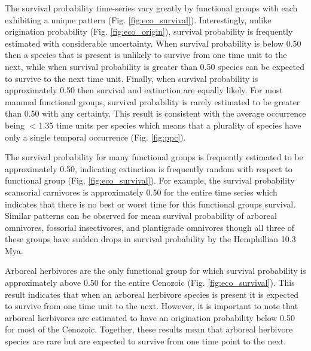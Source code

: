\documentclass[12pt,letterpaper]{article}
\begin{document}
The survival probability time-series vary greatly by functional groups with each exhibiting a unique pattern (Fig. \ref{fig:eco_survival}). Interestingly, unlike origination probability (Fig. \ref{fig:eco_origin}), survival probability is frequently estimated with considerable uncertainty. When survival probability is below 0.50 then a species that is present is unlikely to survive from one time unit to the next, while when survival probability is greater than 0.50 species can be expected to survive to the next time unit. Finally, when survival probability is approximately 0.50 then survival and extinction are equally likely. For most mammal functional groups, survival probability is rarely estimated to be greater than 0.50 with any certainty. This result is consistent with the average occurrence being \(<\)1.35 time units per species which means that a plurality of species have only a single temporal occurrence (Fig. \ref{fig:ppc}).

The survival probability for many functional groups is frequently estimated to be approximately 0.50, indicating extinction is frequently random with respect to functional group (Fig. \ref{fig:eco_survival}). For example, the survival probability scansorial carnivores is approximately 0.50 for the entire time series which indicates that there is no best or worst time for this functional groups survival. Similar patterns can be observed for mean survival probability of arboreal omnivores, fossorial insectivores, and plantigrade omnivores though all three of these groups have sudden drops in survival probability by the Hemphillian 10.3 Mya.

Arboreal herbivores are the only functional group for which survival probability is approximately above 0.50 for the entire Cenozoic (Fig. \ref{fig:eco_survival}). This result indicates that when an arboreal herbivore species is present it is expected to survive from one time unit to the next. However, it is important to note that arboreal herbivores are estimated to have an origination probability below 0.50 for most of the Cenozoic. Together, these results mean that arboreal herbivore species are rare but are expected to survive from one time point to the next.
\end{document}
